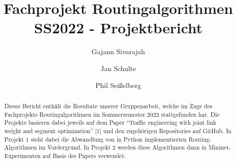 \documentclass[sigconf]{acmart}
\begin{document}
\title{Fachprojekt Routingalgorithmen SS2022 - Projektbericht}


\author{Gajann Sivarajah}
\author{Jan Schulte}
\author{Phil Seißelberg}



\begin{abstract}
  Dieser Bericht enthält die Resultate unserer Gruppenarbeit, welche im Zuge des 
  Fachprojekts Routingalgorithmen im Sommersemester 2022 stattgefunden hat. 
  Die Projekte basieren dabei jeweils auf dem Paper ``Traffic engineering with joint link
  weight and segment optimization'' \cite{originPaper}[1] und den zugehörigen Repositories auf GitHub.
  In Projekt 1 steht dabei die Abwandlung von in Python implementierten Routing-Algorithmen
  im Vordergrund. In Projekt 2 werden diese Algorithmen dann in Mininet-Experimenten auf Basis
  des Papers verwendet.
  \end{abstract}

\end{document}
